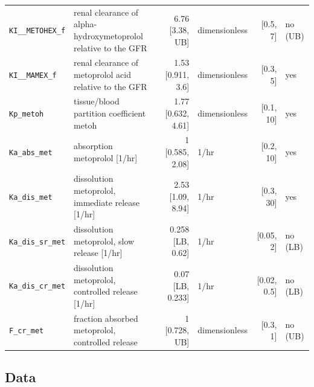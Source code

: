 \begin{longtable}{llrlrl}
\texttt{KI\_\_METOHEX\_f} & renal clearance of alpha-hydroxymetoprolol relative to the GFR & 6.76 [3.38, UB] & dimensionless & [0.5, 7] & no (UB) \\
\texttt{KI\_\_MAMEX\_f} & renal clearance of metoprolol acid relative to the GFR & 1.53 [0.911, 3.6] & dimensionless & [0.3, 5] & yes \\
\texttt{Kp\_metoh} & tissue/blood partition coefficient metoh & 1.77 [0.632, 4.61] & dimensionless & [0.1, 10] & yes \\
\texttt{Ka\_abs\_met} & absorption metoprolol [1/hr] & 1 [0.585, 2.08] & 1/hr & [0.2, 10] & yes \\
\texttt{Ka\_dis\_met} & dissolution metoprolol, immediate release [1/hr] & 2.53 [1.09, 8.94] & 1/hr & [0.3, 30] & yes \\
\texttt{Ka\_dis\_sr\_met} & dissolution metoprolol, slow release [1/hr] & 0.258 [LB, 0.62] & 1/hr & [0.05, 2] & no (LB) \\
\texttt{Ka\_dis\_cr\_met} & dissolution metoprolol, controlled release [1/hr] & 0.07 [LB, 0.233] & 1/hr & [0.02, 0.5] & no (LB) \\
\texttt{F\_cr\_met} & fraction absorbed metoprolol, controlled release & 1 [0.728, UB] & dimensionless & [0.3, 1] & no (UB) \\
\end{longtable}

\subsection{Data}

